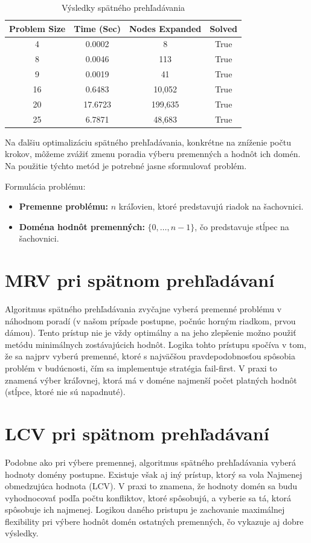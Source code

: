 \begin{table}[h!]
  \centering
  \begin{tabular}{|c|c|c|c|}
    \hline
    \textbf{Problem Size} & \textbf{Time (Sec)} & \textbf{Nodes Expanded} & \textbf{Solved} \\
    \hline
    4 & 0.0002 & 8 & True \\
    8 & 0.0046 & 113 & True \\
    9 & 0.0019 & 41 & True \\
    16 & 0.6483 & 10,052 & True \\
    20 & 17.6723 & 199,635 & True \\
    25 & 6.7871 & 48,683 & True \\
    \hline
  \end{tabular}
  \caption{Výsledky spätného prehľadávania}
  \label{tab:backtracking_basic_results}
\end{table}

Na ďalšiu optimalizáciu spätného prehľadávania, konkrétne na zníženie počtu krokov, môžeme zvážiť zmenu poradia výberu premenných a hodnôt ich domén.
Na použitie týchto metód je potrebné jasne sformulovať problém.

Formulácia problému:
\begin{itemize}
    \item \textbf{Premenne problému:} $n$ kráľovien, ktoré predstavujú riadok na šachovnici.
    \item \textbf{Doména hodnôt premenných:} $\{0, \dots, n - 1\}$, čo predstavuje stĺpec na šachovnici.
\end{itemize}

\section*{MRV pri spätnom prehľadávaní}
Algoritmus spätného prehľadávania zvyčajne vyberá premenné problému v náhodnom poradí (v našom prípade postupne, počnúc horným riadkom, prvou dámou). Tento prístup nie je vždy optimálny a na jeho zlepšenie možno použiť metódu minimálnych zostávajúcich hodnôt.
Logika tohto prístupu spočíva v tom, že sa najprv vyberú premenné, ktoré s najväčšou pravdepodobnosťou spôsobia problém v budúcnosti, čím sa implementuje stratégia fail-first. V praxi to znamená výber kráľovnej, ktorá má v doméne najmenší počet platných hodnôt (stĺpce, ktoré nie sú napadnuté).
\section*{LCV pri spätnom prehľadávaní}
Podobne ako pri výbere premennej, algoritmus spätného prehľadávania vyberá hodnoty domény postupne. Existuje však aj iný prístup, ktorý sa vola Najmenej obmedzujúca hodnota (LCV). V praxi to znamena, že hodnoty domén sa budu vyhodnocovať podľa počtu konfliktov, ktoré spôsobujú, a vyberie sa tá, ktorá spôsobuje ich najmenej. Logikou daného pristupu je zachovanie maximálnej flexibility pri výbere hodnôt domén ostatných premenných, čo vykazuje aj dobre výsledky.

